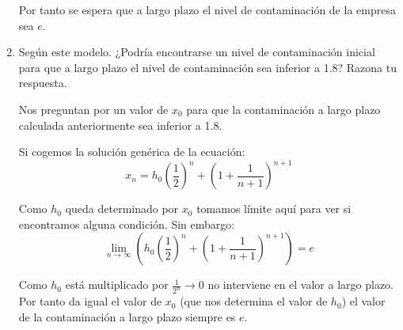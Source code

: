 \documentclass[12pt]{article}
\begin{document}
\begin{ejercicio}[3 puntos]
\begin{enumerate}
    Por tanto se espera que a largo plazo el nivel de contaminación de la empresa sea $e$.
    
    \item Según este modelo. ¿Podría encontrarse un nivel de contaminación inicial para que a largo plazo el nivel de contaminación sea inferior a 1.8? Razona tu respuesta.
    
    Nos preguntan por un valor de $x_0$ para que la contaminación a largo plazo calculada anteriormente sea inferior a 1.8.
    
    Si cogemos la solución genérica de la ecuación:
    \[x_n = h_0\left(\frac{1}{2}\right)^n + \left(1 + \frac{1}{n+1}\right)^{n+1}\]
    
	Como $h_0$ queda determinado por $x_0$ tomamos límite aquí para ver si encontramos alguna condición. Sin embargo:
	\[\lim_{n\to\infty}\left(h_0\left(\frac{1}{2}\right)^n + \left(1 + \frac{1}{n+1}\right)^{n+1}\right) = e\]
	
	Como $h_0$ está multiplicado por $\frac{1}{2^n}\to 0$ no interviene en el valor a largo plazo. Por tanto da igual el valor de $x_0$ (que nos determina el valor de $h_0$) el valor de la contaminación a largo plazo siempre es $e$.
    \end{enumerate}
    \end{ejercicio}
\end{document}
